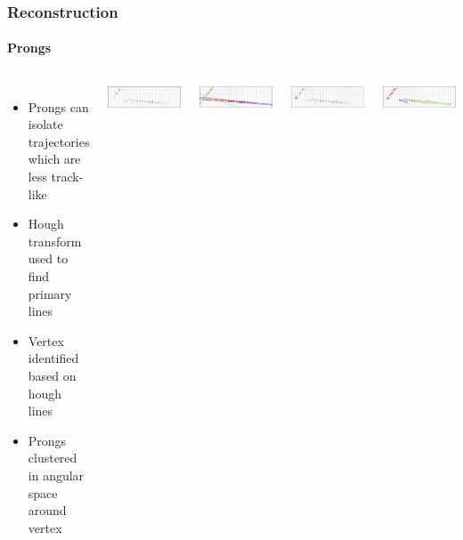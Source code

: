 \documentclass[10pt,professionalfonts,xcolor=table]{beamer}
\begin{document}
\begin{frame}
\begin{columns}[c]
\end{columns}

\end{frame}


\begin{frame}

\frametitle{Reconstruction}
\framesubtitle{Prongs}
\begin{columns}[c]
  \begin{itemize}
  \item Prongs can isolate trajectories which are less track-like
  \gap
  \item Hough transform used to find primary lines
  \gap
  \item Vertex identified based on hough lines
  \gap
  \item Prongs clustered in angular space around vertex

  \end{itemize}

\centering

\includegraphics[width=\textwidth]{figures/evd_steps/slice.png}

\includegraphics[width=\textwidth]{figures/evd_steps/hough.png}

\includegraphics[width=\textwidth]{figures/evd_steps/vertex.png}

\includegraphics[width=\textwidth]{figures/evd_steps/prongs.png}

\end{columns}


\end{frame}
\end{document}
